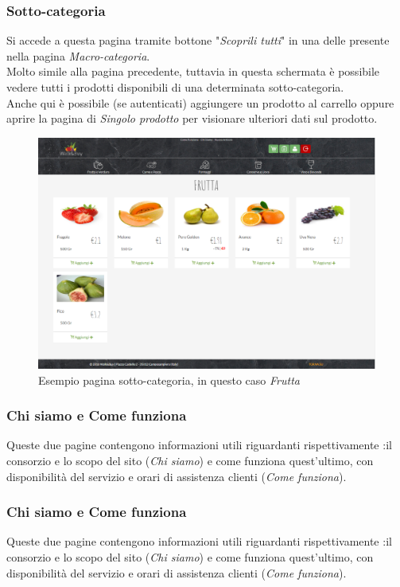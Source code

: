 	\subsubsection{Sotto-categoria}
	Si accede a questa pagina tramite bottone "\textit{Scoprili tutti}" in una delle  presente nella pagina \textit{Macro-categoria}.\\
	Molto simile alla pagina precedente, tuttavia in questa schermata è possibile vedere tutti i prodotti disponibili di una determinata sotto-categoria.\\
	Anche qui è possibile (se autenticati) aggiungere un prodotto al carrello oppure aprire la pagina di \textit{Singolo prodotto} per visionare ulteriori dati sul prodotto.
	\begin{figure}[H]
		\includegraphics[width=\linewidth]{res/img/sotto-cat}
		\caption{Esempio pagina sotto-categoria, in questo caso \textit{Frutta}}
		\label{Pagina Sotto-categoria}
	\end{figure}

	\subsubsection{Chi siamo e Come funziona}
	Queste due pagine contengono informazioni utili riguardanti rispettivamente :il consorzio e lo scopo del sito (\textit{Chi siamo}) e come funziona quest'ultimo, con disponibilità del servizio e orari di assistenza clienti (\textit{Come funziona}).
	 
	\subsubsection{Chi siamo e Come funziona}
	Queste due pagine contengono informazioni utili riguardanti rispettivamente :il consorzio e lo scopo del sito (\textit{Chi siamo}) e come funziona quest'ultimo, con disponibilità del servizio e orari di assistenza clienti (\textit{Come funziona}).
